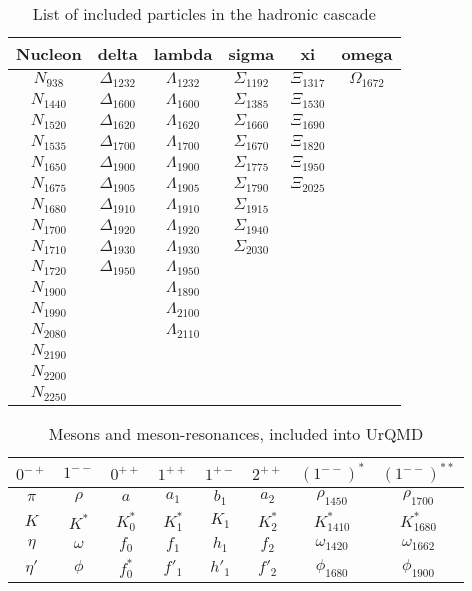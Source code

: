\begin{table}
\centering
\caption{List of included particles in the hadronic cascade}
\label{Baryons}
	\begin{tabular}{cccccc}
		\hline
		Nucleon & delta & lambda & sigma & xi & omega\\
		\hline
		\hline
		$N_{938 }$ & $\Delta_{1232}$ & $\Lambda_{1232}$ & $\Sigma_{1192}$ & $\Xi_{1317}$ & $\Omega_{1672}$\\
		$N_{1440}$ & $\Delta_{1600}$ & $\Lambda_{1600}$ & $\Sigma_{1385}$ & $\Xi_{1530}$ & \\
		$N_{1520}$ & $\Delta_{1620}$ & $\Lambda_{1620}$ & $\Sigma_{1660}$ & $\Xi_{1690}$ & \\
		$N_{1535}$ & $\Delta_{1700}$ & $\Lambda_{1700}$ & $\Sigma_{1670}$ & $\Xi_{1820}$ & \\
		$N_{1650}$ & $\Delta_{1900}$ & $\Lambda_{1900}$ & $\Sigma_{1775}$ & $\Xi_{1950}$ & \\
		$N_{1675}$ & $\Delta_{1905}$ & $\Lambda_{1905}$ & $\Sigma_{1790}$ & $\Xi_{2025}$ & \\
		$N_{1680}$ & $\Delta_{1910}$ & $\Lambda_{1910}$ & $\Sigma_{1915}$ &  & \\
		$N_{1700}$ & $\Delta_{1920}$ & $\Lambda_{1920}$ & $\Sigma_{1940}$ &  & \\
		$N_{1710}$ & $\Delta_{1930}$ & $\Lambda_{1930}$ & $\Sigma_{2030}$ &  & \\
		$N_{1720}$ & $\Delta_{1950}$ & $\Lambda_{1950}$ &  &  & \\
		$N_{1900}$ &  & $\Lambda_{1890}$ &  &  & \\
		$N_{1990}$ &  & $\Lambda_{2100}$ &  &  & \\
		$N_{2080}$ &  & $\Lambda_{2110}$ &  &  & \\
		$N_{2190}$ &  &  &  &  & \\
		$N_{2200}$ &  &  &  &  & \\
		$N_{2250}$ &  &  &  &  & \\
		\hline
		\hline
	\end{tabular}
\end{table}
\begin{table}
	\centering
	\caption{Mesons and meson-resonances, included into UrQMD}
	\label{mesons}
	\begin{tabular}{cccccccc}
		\hline
		$0^{-+}$& $1^{--}$& $0^{++}$& $1^{++}$& $1^{+-} $&$2^{++}$ &$(1^{--})^*$ &$(1^{--})^{**}$\\
		\hline
		\hline
		$\pi$& $\rho$& $a$& $a_1$& $b_1$&$a_2$ &$\rho_{1450}$ &$\rho_{1700}$\\
		$K$ &$K^*$ &$K_0^*$&$K_1^*$ &$K_1$ &$K_2^*$ &$K^*_{1410}$ &$K^*_{1680}$\\
		$\eta$& $\omega$& $f_0$& $f_1$& $h_1$&$f_2$ &$\omega_{1420}$ &$\omega_{1662}$\\
		$\eta'$& $\phi$& $f^*_0$& $f'_1$& $h'_1$&$f'_2$ &$\phi_{1680}$ &$\phi_{1900}$\\

		\hline
		\hline
	\end{tabular}
\end{table}

